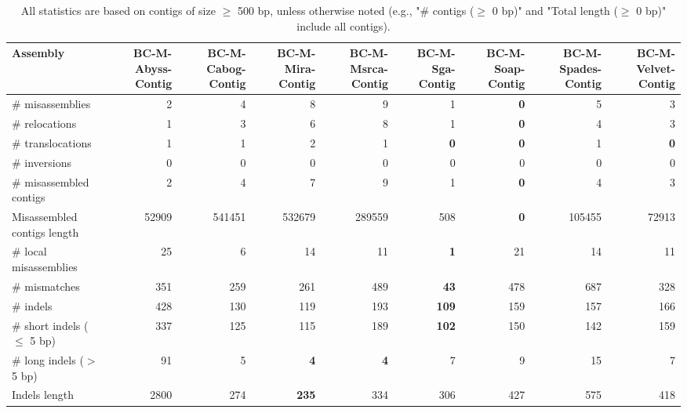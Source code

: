 \documentclass[12pt,a4paper]{article}
\begin{document}
\begin{table}[ht]
\begin{center}
\caption{All statistics are based on contigs of size $\geq$ 500 bp, unless otherwise noted (e.g., "\# contigs ($\geq$ 0 bp)" and "Total length ($\geq$ 0 bp)" include all contigs).}
\begin{tabular}{|l*{8}{|r}|}
\hline
Assembly & BC-M-Abyss-Contig & BC-M-Cabog-Contig & BC-M-Mira-Contig & BC-M-Msrca-Contig & BC-M-Sga-Contig & BC-M-Soap-Contig & BC-M-Spades-Contig & BC-M-Velvet-Contig \\ \hline
\# misassemblies & 2 & 4 & 8 & 9 & 1 & {\bf 0} & 5 & 3 \\ \hline
\hspace{5mm}\# relocations & 1 & 3 & 6 & 8 & 1 & {\bf 0} & 4 & 3 \\ \hline
\hspace{5mm}\# translocations & 1 & 1 & 2 & 1 & {\bf 0} & {\bf 0} & 1 & {\bf 0} \\ \hline
\hspace{5mm}\# inversions & 0 & 0 & 0 & 0 & 0 & 0 & 0 & 0 \\ \hline
\# misassembled contigs & 2 & 4 & 7 & 9 & 1 & {\bf 0} & 4 & 3 \\ \hline
Misassembled contigs length & 52909 & 541451 & 532679 & 289559 & 508 & {\bf 0} & 105455 & 72913 \\ \hline
\# local misassemblies & 25 & 6 & 14 & 11 & {\bf 1} & 21 & 14 & 11 \\ \hline
\# mismatches & 351 & 259 & 261 & 489 & {\bf 43} & 478 & 687 & 328 \\ \hline
\# indels & 428 & 130 & 119 & 193 & {\bf 109} & 159 & 157 & 166 \\ \hline
\hspace{5mm}\# short indels ($\leq$ 5 bp) & 337 & 125 & 115 & 189 & {\bf 102} & 150 & 142 & 159 \\ \hline
\hspace{5mm}\# long indels ($>$ 5 bp) & 91 & 5 & {\bf 4} & {\bf 4} & 7 & 9 & 15 & 7 \\ \hline
Indels length & 2800 & 274 & {\bf 235} & 334 & 306 & 427 & 575 & 418 \\ \hline
\end{tabular}
\end{center}
\end{table}
\end{document}
